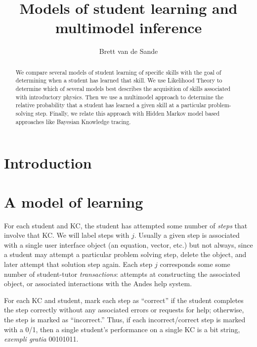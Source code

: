 \documentclass[11pt,letterpaper]{article}
\begin{document}
\title{Models of student learning and multimodel inference}
\author{Brett van de Sande}

\maketitle

\begin{abstract}
We compare several models of student learning of specific
skills with the goal of determining when a student has 
learned that skill.  We use Likelihood Theory to determine
which of several models best describes the acquisition
of skills associated with introductory physics.  Then we
use a multimodel approach to determine the relative probability
that a student has learned a given skill at a particular 
problem-solving step.  Finally, we relate this
approach with Hidden Markov model based approaches like
Bayesian Knowledge tracing.
\end{abstract}

\section{Introduction}

\section{A model of learning}

For each student and KC, the student has attempted some number of 
{\em steps} that involve that KC.   We will label
steps with $j$.  Usually a given step is associated
with a single user interface object (an equation, vector, etc.)  but
not always, since a student may attempt a particular problem solving
step, delete the object, and later attempt that solution step again.
Each step $j$ corresponds some some number of student-tutor 
{\em transactions}: attempts at constructing the associated object, 
or associated interactions with the Andes help system.  

For each KC and student, mark each step as ``correct'' if
the student completes the step correctly without any associated errors or 
requests for help; otherwise, the step is marked as ``incorrect.''
\label{steps} 
%
Thus, if each incorrect/correct step is marked with a 0/1, then
a single student's performance on a single KC is a bit string,
{\em exempli gratia} 00101011.
\end{document}
